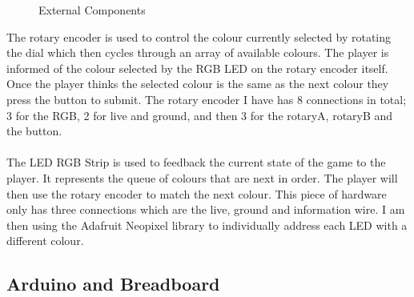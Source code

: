 \documentclass{article}
\begin{document}
\begin{figure}[ht]%
    \centering
    \qquad
    \caption{External Components}%
    \label{fig:external_component}%
\end{figure}

The rotary encoder is used to control the colour currently selected by rotating the dial which then cycles through an array of available colours. The player is informed of the colour selected by the RGB LED on the rotary encoder itself. Once the player thinks the selected colour is the same as the next colour they press the button to submit. The rotary encoder I have has 8 connections in total; 3 for the RGB, 2 for live and ground, and then 3 for the rotaryA, rotaryB and the button.
\\
\\
The LED RGB Strip is used to feedback the current state of the game to the player. It represents the queue of colours that are next in order. The player will then use the rotary encoder to match the next colour. This piece of hardware only has three connections which are the live, ground and information wire. I am then using the Adafruit Neopixel library to individually address each LED with a different colour.

\subsection{Arduino and Breadboard}
\end{document}
